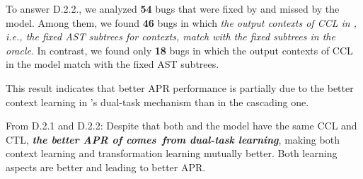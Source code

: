 To answer D.2.2., we analyzed {\bf 54} bugs that were fixed by {\tool}
and missed by the  model. Among them, we found {\bf
  46} bugs in which {\em the output contexts of CCL in {\tool}, i.e.,
  the fixed AST subtrees for contexts, match with the fixed subtrees
  in the oracle}. In contrast, we found only {\bf 18} bugs in which
the output contexts of CCL in the  model match with
the fixed AST subtrees.

This result indicates that better APR performance is partially due to
the better context learning in {\tool}'s dual-task mechanism than in
the cascading one.


From D.2.1 and D.2.2: Despite that both {\tool} and the
 model have the same CCL and CTL, {\bf {\em the better
    APR of {\tool} comes~from dual-task learning}},
 making both context learning and transformation learning mutually
 better. Both learning aspects are better and leading
 to better APR.









